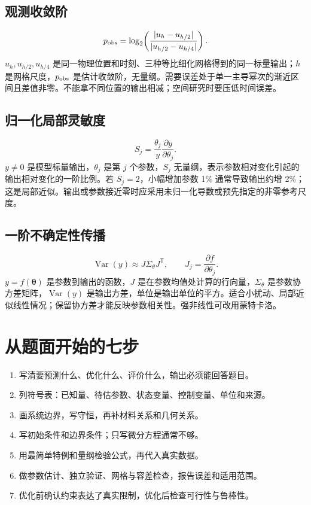 \subsection{观测收敛阶}
\begin{equation}p_{\rm obs}=\log_2\!\left(\frac{|u_h-u_{h/2}|}{|u_{h/2}-u_{h/4}|}\right).\end{equation}
$u_h,u_{h/2},u_{h/4}$ 是同一物理位置和时刻、三种等比细化网格得到的同一标量输出；$h$ 是网格尺度，$p_{\rm obs}$ 是估计收敛阶，无量纲。需要误差处于单一主导幂次的渐近区间且差值非零。不能拿不同位置的输出相减；空间研究时要压低时间误差。
\subsection{归一化局部灵敏度}
\begin{equation}S_j=\frac{\theta_j}{y}\frac{\partial y}{\partial\theta_j}.\end{equation}
$y\ne0$ 是模型标量输出，$\theta_j$ 是第 $j$ 个参数，$S_j$ 无量纲，表示参数相对变化引起的输出相对变化的一阶比例。若 $S_j=2$，小幅增加参数 1\% 通常导致输出约增 2\%；这是局部近似。输出或参数接近零时应采用未归一化导数或预先指定的非零参考尺度。
\subsection{一阶不确定性传播}
\begin{equation}\operatorname{Var}(y)\approx J\Sigma_\theta J^\mathsf T,\qquad J_j=\frac{\partial f}{\partial\theta_j}.\end{equation}
$y=f(\boldsymbol\theta)$ 是参数到输出的函数，$J$ 是在参数均值处计算的行向量，$\Sigma_\theta$ 是参数协方差矩阵，$\operatorname{Var}(y)$ 是输出方差，单位是输出单位的平方。适合小扰动、局部近似线性情况；保留协方差才能反映参数相关性。强非线性可改用蒙特卡洛。

\section{从题面开始的七步}
\begin{enumerate}
\item 写清要预测什么、优化什么、评价什么，输出必须能回答题目。
\item 列符号表：已知量、待估参数、状态变量、控制变量、单位和来源。
\item 画系统边界，写守恒，再补材料关系和几何关系。
\item 写初始条件和边界条件；只写微分方程通常不够。
\item 用最简单特例和量纲检验公式，再代入真实数据。
\item 做参数估计、独立验证、网格与容差检查，报告误差和适用范围。
\item 优化前确认约束表达了真实限制，优化后检查可行性与鲁棒性。
\end{enumerate}
